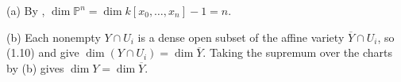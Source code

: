 (a) By , $\dim\mathbb P^n=\dim k[x_0,\ldots,x_n]-1=n$.

(b) Each nonempty $Y\cap U_i$ is a dense open subset of the affine variety $\overline Y\cap U_i$, so (1.10) and  give $\dim(Y\cap U_i)=\dim\overline Y$. Taking the supremum over the charts by (b) gives $\dim Y=\dim\overline Y$.
